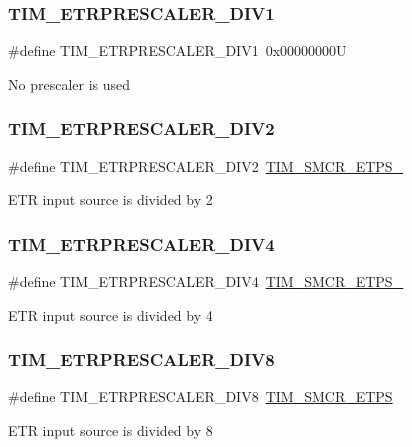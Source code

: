 \subsubsection{\texorpdfstring{TIM\_ETRPRESCALER\_DIV1}{TIM\_ETRPRESCALER\_DIV1}}
{\footnotesize\ttfamily \#define T\+I\+M\+\_\+\+E\+T\+R\+P\+R\+E\+S\+C\+A\+L\+E\+R\+\_\+\+D\+I\+V1~0x00000000U}

No prescaler is used \mbox{\label{group___t_i_m___e_t_r___prescaler_gaf7fe49f67bdb6b33b9b41953fee75680}} 
\subsubsection{\texorpdfstring{TIM\_ETRPRESCALER\_DIV2}{TIM\_ETRPRESCALER\_DIV2}}
{\footnotesize\ttfamily \#define T\+I\+M\+\_\+\+E\+T\+R\+P\+R\+E\+S\+C\+A\+L\+E\+R\+\_\+\+D\+I\+V2~\mbox{\hyperlink{group___peripheral___registers___bits___definition_ga00b43cd09557a69ed10471ed76b228d8}{T\+I\+M\+\_\+\+S\+M\+C\+R\+\_\+\+E\+T\+P\+S\+\_}}}

E\+TR input source is divided by 2 \mbox{\label{group___t_i_m___e_t_r___prescaler_gaa09da30c3cd28f1fe6b6f3f599a5212c}} 
\subsubsection{\texorpdfstring{TIM\_ETRPRESCALER\_DIV4}{TIM\_ETRPRESCALER\_DIV4}}
{\footnotesize\ttfamily \#define T\+I\+M\+\_\+\+E\+T\+R\+P\+R\+E\+S\+C\+A\+L\+E\+R\+\_\+\+D\+I\+V4~\mbox{\hyperlink{group___peripheral___registers___bits___definition_gabf12f04862dbc92ca238d1518b27b16b}{T\+I\+M\+\_\+\+S\+M\+C\+R\+\_\+\+E\+T\+P\+S\+\_}}}

E\+TR input source is divided by 4 \mbox{\label{group___t_i_m___e_t_r___prescaler_ga834e38200874cced108379b17a24d0b7}} 
\subsubsection{\texorpdfstring{TIM\_ETRPRESCALER\_DIV8}{TIM\_ETRPRESCALER\_DIV8}}
{\footnotesize\ttfamily \#define T\+I\+M\+\_\+\+E\+T\+R\+P\+R\+E\+S\+C\+A\+L\+E\+R\+\_\+\+D\+I\+V8~\mbox{\hyperlink{group___peripheral___registers___bits___definition_ga0ebb9e631876435e276211d88e797386}{T\+I\+M\+\_\+\+S\+M\+C\+R\+\_\+\+E\+T\+PS}}}

E\+TR input source is divided by 8 